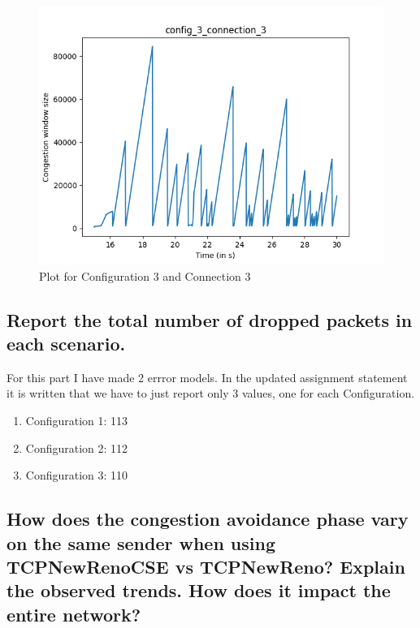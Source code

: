 \documentclass{article}
\begin{document}
\begin{figure}[H]
    \centering
    \includegraphics[scale = 0.8]{Q3/outputs/plots/config_3_connection_3.png}
    \caption{Plot for Configuration 3 and Connection 3}
\end{figure}

\subsection{Report the total number of dropped packets in each scenario.}

For this part I have made 2 errror models. In the updated assignment statement it is written that we have to just report only 3 values, one for each Configuration.

\begin{enumerate}
    \item Configuration 1: 113
    \item Configuration 2: 112
    \item Configuration 3: 110
\end{enumerate}

\subsection{How does the congestion avoidance phase vary on the same sender when using
TCPNewRenoCSE vs TCPNewReno? Explain the observed trends. How does it
impact the entire network?}

\end{document}
